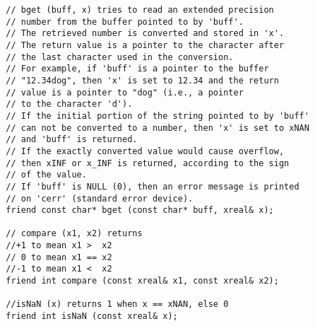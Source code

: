\documentclass{article}
\begin{document}
\begin{verbatim}
  // bget (buff, x) tries to read an extended precision
  // number from the buffer pointed to by 'buff'. 
  // The retrieved number is converted and stored in 'x'.
  // The return value is a pointer to the character after
  // the last character used in the conversion.
  // For example, if 'buff' is a pointer to the buffer
  // "12.34dog", then 'x' is set to 12.34 and the return 
  // value is a pointer to "dog" (i.e., a pointer
  // to the character 'd').
  // If the initial portion of the string pointed to by 'buff'
  // can not be converted to a number, then 'x' is set to xNAN
  // and 'buff' is returned.
  // If the exactly converted value would cause overflow, 
  // then xINF or x_INF is returned, according to the sign 
  // of the value.
  // If 'buff' is NULL (0), then an error message is printed
  // on 'cerr' (standard error device).
  friend const char* bget (const char* buff, xreal& x);

  // compare (x1, x2) returns
  //+1 to mean x1 >  x2
  // 0 to mean x1 == x2
  //-1 to mean x1 <  x2
  friend int compare (const xreal& x1, const xreal& x2);

  //isNaN (x) returns 1 when x == xNAN, else 0
  friend int isNaN (const xreal& x);


\end{verbatim}
\end{document}
